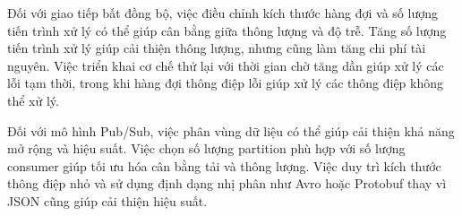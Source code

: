 Đối với giao tiếp bất đồng bộ, việc điều chỉnh kích thước hàng đợi và số lượng tiến trình xử lý có thể giúp cân bằng giữa thông lượng và độ trễ. Tăng số lượng tiến trình xử lý giúp cải thiện thông lượng, nhưng cũng làm tăng chi phí tài nguyên. Việc triển khai cơ chế thử lại với thời gian chờ tăng dần giúp xử lý các lỗi tạm thời, trong khi hàng đợi thông điệp lỗi giúp xử lý các thông điệp không thể xử lý.

Đối với mô hình Pub/Sub, việc phân vùng dữ liệu có thể giúp cải thiện khả năng mở rộng và hiệu suất. Việc chọn số lượng partition phù hợp với số lượng consumer giúp tối ưu hóa cân bằng tải và thông lượng. Việc duy trì kích thước thông điệp nhỏ và sử dụng định dạng nhị phân như Avro hoặc Protobuf thay vì JSON cũng giúp cải thiện hiệu suất.